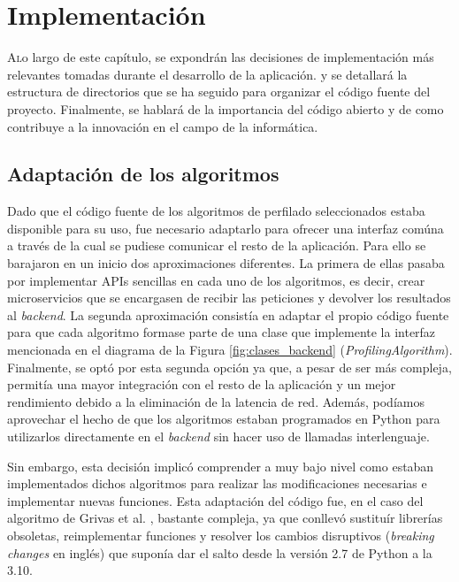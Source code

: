 \chapter{Implementación}
\label{chap:implementacion}

\lettrine{A} lo largo de este capítulo, se expondrán las decisiones de implementación más relevantes tomadas durante el desarrollo de la aplicación.
y se detallará la estructura de directorios que se ha seguido para organizar el código fuente del proyecto. Finalmente, se hablará
de la importancia del código abierto y de como contribuye a la innovación en el campo de la informática.

\section{Adaptación de los algoritmos}
\label{sec:adaptacion_algoritmos}

{
	\color{blue}
	Dado que el código fuente de los algoritmos de perfilado seleccionados estaba disponible para su uso, fue necesario adaptarlo
	para ofrecer una interfaz comúna a través de la cual se pudiese comunicar el resto de la aplicación.
	Para ello se barajaron en un inicio dos aproximaciones diferentes. La primera de ellas pasaba
	por implementar APIs sencillas en cada uno de los algoritmos, es decir, crear microservicios que se encargasen de recibir
	las peticiones y devolver los resultados al \textit{backend}. La segunda aproximación consistía en adaptar el propio código
	fuente para que cada algoritmo formase parte de una clase que implemente la interfaz mencionada en el diagrama de la Figura \ref{fig:clases_backend}
	(\textit{ProfilingAlgorithm}). Finalmente, se optó por esta segunda opción ya que, a pesar de ser más compleja, permitía
	una mayor integración con el resto de la aplicación y un mejor rendimiento debido a la eliminación de la latencia de red. Además,
	podíamos aprovechar el hecho de que los algoritmos estaban programados en Python para utilizarlos directamente
	en el \textit{backend} sin hacer uso de llamadas interlenguaje.

	\bigskip
	Sin embargo, esta decisión implicó comprender a muy bajo nivel como estaban implementados dichos algoritmos para realizar las modificaciones necesarias
	e implementar nuevas funciones. Esta adaptación del código fue, en el caso del algoritmo de Grivas et al. \cite{grivas2015author},
	bastante compleja, ya que conllevó sustituír librerías obsoletas, reimplementar funciones y resolver los cambios disruptivos (\textit{breaking changes} en inglés) que suponía
	dar el salto desde la versión 2.7 de Python a la 3.10.
}

